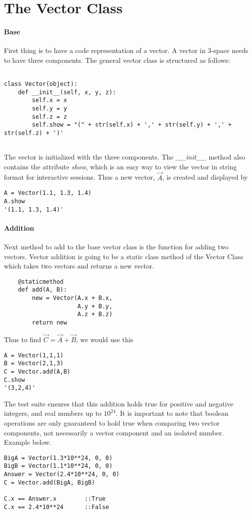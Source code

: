 \documentclass[15pt]{report}
\begin{document}
\newpage
\section{The Vector Class}
\paragraph{Base} First thing is to have a code representation of a vector. A vector in 3-space needs to have three components. The general vector class is structured as follows:

\begin{lstlisting}

class Vector(object):
    def __init__(self, x, y, z):
        self.x = x
        self.y = y
        self.z = z
        self.show = "(" + str(self.x) + ',' + str(self.y) + ',' + str(self.z) + ')'
           

\end{lstlisting}
The vector is initialized with the three components. The \textit{\_\_init\_\_} method also contains the attribute \textit{show}, which is an easy way to view the vector in string format for interactive sessions. Thus a new vector, $\vec{A}$, is created and displayed by
\begin{lstlisting}
A = Vector(1.1, 1.3, 1.4)
A.show
'(1.1, 1.3, 1.4)'
\end{lstlisting}

\paragraph{Addition} Next method to add to the base vector class is the function for adding two vectors. Vector addition is going to be a static class method of the Vector Class which takes two vectors and returns a new vector.
\begin{lstlisting}
    @staticmethod
    def add(A, B):
        new = Vector(A.x + B.x, 
                     A.y + B.y,
                     A.z + B.z)
        return new
\end{lstlisting}
Thus to find $\vec{C} =\vec{A} + \vec{B}$, we would use this
\begin{lstlisting}
A = Vector(1,1,1)
B = Vector(2,1,3)
C = Vector.add(A,B)
C.show
'(3,2,4)'
\end{lstlisting} 
The test suite ensures that this addition holds true for positive and negative integers, and real numbers up to $10^{24}$. It is important to note that boolean operations are only guaranteed to hold true when comparing two vector components, not necessarily a vector component and an isolated number. Example below.
\begin{lstlisting}
BigA = Vector(1.3*10**24, 0, 0)
BigB = Vector(1.1*10**24, 0, 0)
Answer = Vector(2.4*10**24, 0, 0)
C = Vector.add(BigA, BigB)

C.x == Answer.x        ::True
C.x == 2.4*10**24      ::False
\end{lstlisting} 
\end{document}
